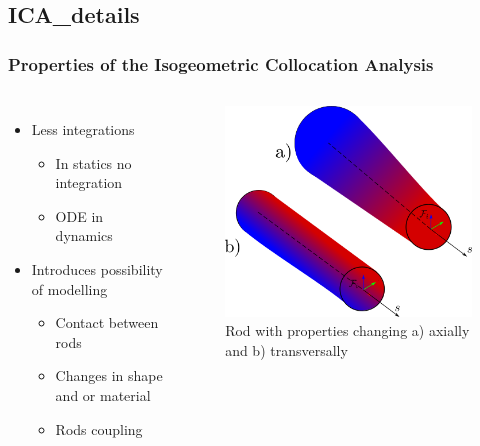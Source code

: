 \documentclass[compress]{thesisbeamer}
\begin{document}
		\subsection{ICA_details}
        \begin{frame}
        	\frametitle{Properties of the Isogeometric Collocation Analysis}
        	\begin{columns}
			\begin{itemize}%
  				\item Less integrations
  				\begin{itemize}
  					\item In statics no integration
  					\item ODE in dynamics
  				\end{itemize}
  				\item Introduces possibility of modelling
  				\begin{itemize}
  					\item Contact between rods
  					\item Changes in shape and or material 
  					\item Rods coupling
  				\end{itemize}
 			\end{itemize}
 			\vspace{2cm}
			\begin{figure}[h]
				\centering
				\includegraphics[width=\textwidth]{images/AV_TV}
				\caption{Rod with properties changing a) axially and b) transversally}
			\end{figure}
			\end{columns}
		\end{frame}
\end{document}
